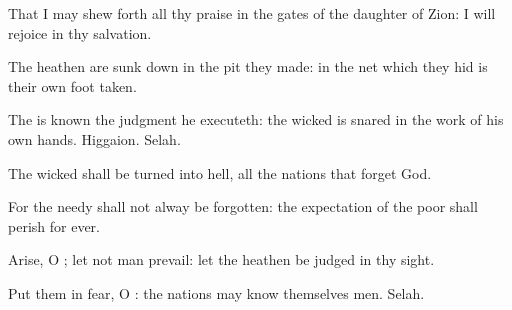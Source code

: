 {\par }{\Q {}That I may shew
forth all thy
praise in the
gates of the
daughter of
Zion: I will
rejoice in thy
salvation.
\par }{\Q {}The
heathen are sunk
down in the
pit
{} they
made: in the
net
which they
hid is their own
foot
taken.
\par }{\Q {}The
{} is
known
{} the
judgment
{} he
executeth: the
wicked is
snared in the
work of his own
hands.
Higgaion.
Selah.
\par }{\Q {}The
wicked shall be
turned into
hell,
{} all the
nations that
forget
God.
\par }{\Q {}For the
needy shall not
alway be
forgotten: the
expectation of the
poor shall
{}
perish for
ever.
\par }{\Q {}Arise, O
{}; let not
man
prevail: let the
heathen be
judged in thy
sight.
\par }{\Q {}Put them in
fear, O
{}:
{} the
nations may
know themselves
{}
men.
Selah.

}

